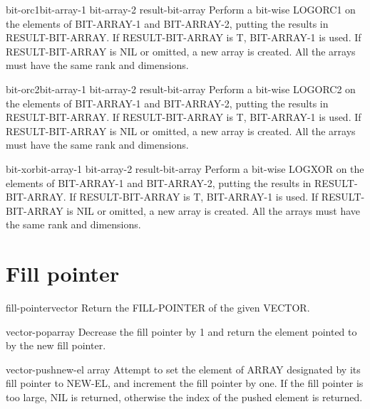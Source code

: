 \documentclass[10pt,english]{book}
\begin{document}
\begin{function}{bit-orc1}{bit-array-1 bit-array-2 \op result-bit-array}
  Perform a bit-wise LOGORC1 on the elements of BIT-ARRAY-1 and BIT-ARRAY-2,
  putting the results in RESULT-BIT-ARRAY. If RESULT-BIT-ARRAY is T,
  BIT-ARRAY-1 is used. If RESULT-BIT-ARRAY is NIL or omitted, a new array is
  created. All the arrays must have the same rank and dimensions.
\end{function}

\begin{function}{bit-orc2}{bit-array-1 bit-array-2 \op result-bit-array}
  Perform a bit-wise LOGORC2 on the elements of BIT-ARRAY-1 and BIT-ARRAY-2,
  putting the results in RESULT-BIT-ARRAY. If RESULT-BIT-ARRAY is T,
  BIT-ARRAY-1 is used. If RESULT-BIT-ARRAY is NIL or omitted, a new array is
  created. All the arrays must have the same rank and dimensions.
\end{function}

\begin{function}{bit-xor}{bit-array-1 bit-array-2 \op result-bit-array}
  Perform a bit-wise LOGXOR on the elements of BIT-ARRAY-1 and BIT-ARRAY-2,
  putting the results in RESULT-BIT-ARRAY. If RESULT-BIT-ARRAY is T,
  BIT-ARRAY-1 is used. If RESULT-BIT-ARRAY is NIL or omitted, a new array is
  created. All the arrays must have the same rank and dimensions.
\end{function}

\section{Fill pointer}
\label{sec:fill-pointer}

\begin{accessor}{fill-pointer}{vector}
  Return the FILL-POINTER of the given VECTOR.
\end{accessor}

\begin{function}{vector-pop}{array}
  Decrease the fill pointer by 1 and return the element pointed to by the
  new fill pointer.
\end{function}

\begin{function}{vector-push}{new-el array}
  Attempt to set the element of ARRAY designated by its fill pointer
   to NEW-EL, and increment the fill pointer by one. If the fill pointer is
   too large, NIL is returned, otherwise the index of the pushed element is
   returned.
\end{function}
\end{document}
